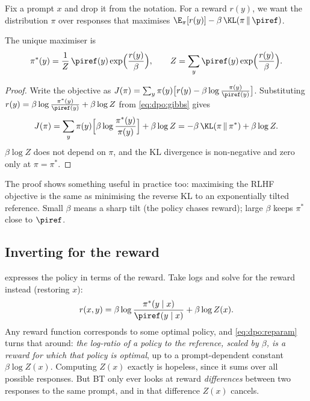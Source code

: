 Fix a prompt $x$ and drop it from the notation. For a reward $r(y)$, we want the distribution
$\pi$ over responses that maximises $\E_{\pi}[r(y)] - \beta\,\KL(\pi\,\|\,\piref)$.

\begin{proposition}\label{prop:dpo:gibbs}
The unique maximiser is
\begin{equation}
\pi^*(y) = \frac{1}{Z}\,\piref(y)\exp\!\Big(\frac{r(y)}{\beta}\Big),\qquad
Z = \sum_{y}\piref(y)\exp\!\Big(\frac{r(y)}{\beta}\Big).
\label{eq:dpo:gibbs}
\end{equation}
\end{proposition}
\begin{proof}
Write the objective as
$J(\pi)=\sum_y \pi(y)\big[r(y)-\beta\log\frac{\pi(y)}{\piref(y)}\big]$. Substituting
$r(y)=\beta\log\frac{\pi^*(y)}{\piref(y)}+\beta\log Z$ from \eqref{eq:dpo:gibbs} gives
\[
J(\pi)=\sum_y\pi(y)\Big[\beta\log\frac{\pi^*(y)}{\pi(y)}\Big]+\beta\log Z
      =-\beta\,\KL(\pi\,\|\,\pi^*)+\beta\log Z .
\]
$\beta\log Z$ does not depend on $\pi$, and the KL divergence is non-negative and zero only at
$\pi=\pi^*$.
\end{proof}

The proof shows something useful in practice too: maximising the RLHF objective is the same as
minimising the reverse KL to an exponentially tilted reference. Small $\beta$ means a sharp tilt
(the policy chases reward); large $\beta$ keeps $\pi^*$ close to $\piref$.

\subsection{Inverting for the reward}

 expresses the policy in terms of the reward. Take logs and solve for the
reward instead (restoring $x$):
\begin{equation}
r(x,y) = \beta\log\frac{\pi^*(y\mid x)}{\piref(y\mid x)} + \beta\log Z(x).
\label{eq:dpo:reparam}
\end{equation}
Any reward function corresponds to some optimal policy, and \eqref{eq:dpo:reparam} turns that
around: \emph{the log-ratio of a policy to the reference, scaled by $\beta$, is a reward for which
that policy is optimal}, up to a prompt-dependent constant $\beta\log Z(x)$. Computing $Z(x)$
exactly is hopeless, since it sums over all possible responses. But BT only ever looks at reward
\emph{differences} between two responses to the same prompt, and in that difference $Z(x)$
cancels.

